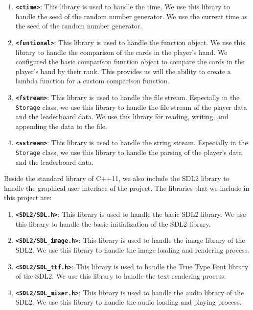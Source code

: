 \begin{enumerate}
    \item \textbf{\texttt{<ctime>}}: This library is used to handle the time. We use this library to handle the seed of the random number generator. We use the current time as the seed of the random number generator.
    \item \textbf{\texttt{<funtional>}}: This library is used to handle the function object. We use this library to handle the comparison of the cards in the player's hand. We configured the basic comparison function object to compare the cards in the player's hand by their rank. This provides us will the ability to create a lambda function for a custom comparison function.
    \item \textbf{\texttt{<fstream>}}: This library is used to handle the file stream. Especially in the \texttt{Storage} class, we use this library to handle the file stream of the player data and the leaderboard data. We use this library for reading, writing, and appending the data to the file.
    \item \textbf{\texttt{<sstream>}}: This library is used to handle the string stream. Especially in the \texttt{Storage} class, we use this library to handle the parsing of the player's data and the leaderboard data.
\end{enumerate}

\hspace{1cm} Beside the standard library of C++11, we also include the SDL2 library to handle the graphical user interface of the project. The libraries that we include in this project are:
\begin{enumerate}
    \item \textbf{\texttt{<SDL2/SDL.h>}}: This library is used to handle the basic SDL2 library. We use this library to handle the basic initialization of the SDL2 library.
    \item \textbf{\texttt{<SDL2/SDL\_image.h>}}: This library is used to handle the image library of the SDL2. We use this library to handle the image loading and rendering process.
    \item \textbf{\texttt{<SDL2/SDL\_ttf.h>}}: This library is used to handle the True Type Font library of the SDL2. We use this library to handle the text rendering process.
    \item \textbf{\texttt{<SDL2/SDL\_mixer.h>}}: This library is used to handle the audio library of the SDL2. We use this library to handle the audio loading and playing process.
\end{enumerate}

